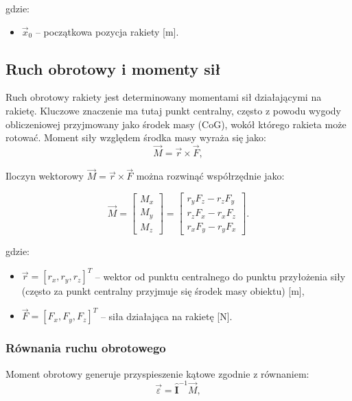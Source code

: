 gdzie:
\begin{itemize}
\item $\vec{x}_0$ -- początkowa pozycja rakiety [m].
\end{itemize}



\subsection{Ruch obrotowy i momenty sił}
Ruch obrotowy rakiety jest determinowany momentami sił działającymi na
rakietę. Kluczowe znaczenie ma tutaj punkt centralny, często z powodu wygody
obliczeniowej przyjmowany jako środek masy (CoG), wokół którego rakieta może rotować. Moment siły względem środka masy wyraża się jako:
\begin{equation}
\vec{M} = \vec{r} \times \vec{F},
\label{eq:moment_force}
\end{equation}

Iloczyn wektorowy $\vec{M} = \vec{r} \times \vec{F}$ można rozwinąć współrzędnie jako:

\begin{equation}
\vec{M} =
\begin{bmatrix}
M_x \\
M_y \\
M_z
\end{bmatrix}
=
\begin{bmatrix}
r_y F_z - r_z F_y \\
r_z F_x - r_x F_z \\
r_x F_y - r_y F_x
\end{bmatrix}.
\label{eq:moment_force_matrix}
\end{equation}

gdzie:
\begin{itemize}
\item $\vec{r} = [r_x, r_y, r_z]^T$ -- wektor od punktu centralnego do punktu przyłożenia siły (często za punkt centralny przyjmuje się środek masy obiektu) [m],
\item $\vec{F} = [F_x, F_y, F_z]^T$ -- siła działająca na rakietę [N].
\end{itemize}


\subsubsection{Równania ruchu obrotowego}
Moment obrotowy generuje przyspieszenie kątowe zgodnie z równaniem:
\begin{equation}
\vec{\varepsilon} = \mathbf{\hat{I}}^{-1} \vec{M},
\label{eq:angular_acceleration_tensor}
\end{equation}

